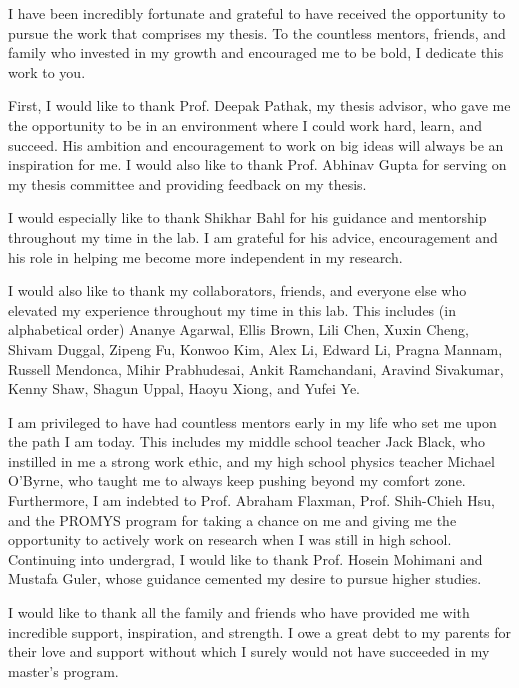 \documentclass[12pt]{cmuthesis}
\begin{document}
\begin{acknowledgments}
  I have been incredibly fortunate and grateful to have 
  received the opportunity to pursue the work that comprises
  my thesis. To the countless mentors, friends, and
  family who invested in my growth and encouraged me to be
  bold, I dedicate this work to you.

  First, I would like to thank Prof. Deepak Pathak, my 
  thesis  advisor, who gave me the opportunity to be 
  in an environment where I could work hard, learn, 
  and succeed. His ambition and encouragement to work
  on big ideas will always be an inspiration for me. 
  I would also like to thank Prof. Abhinav Gupta for
  serving on my thesis committee and providing feedback
  on my thesis.

  I would especially like to thank Shikhar Bahl for his
  guidance and mentorship throughout my time in the lab. 
  I am grateful for his advice, encouragement and his role
  in helping me become more independent in my research.

  I would also like to thank my collaborators, friends, 
  and everyone else who elevated my experience throughout
  my time in this lab. This includes (in alphabetical order)
  Ananye Agarwal, Ellis Brown, Lili Chen, Xuxin Cheng,
  Shivam Duggal, Zipeng Fu, Konwoo Kim, Alex Li, Edward Li, 
  Pragna Mannam, Russell Mendonca, Mihir Prabhudesai,
  Ankit Ramchandani, Aravind Sivakumar, Kenny Shaw, 
  Shagun Uppal, Haoyu Xiong, and Yufei Ye.

  I am privileged to have had countless mentors early in
  my life who set me upon the path I am today. This 
  includes my middle school teacher Jack Black, who 
  instilled in me a strong work ethic, and my high school 
  physics teacher Michael O'Byrne, who taught me to always
  keep pushing beyond my comfort zone. Furthermore, I 
  am indebted to Prof. Abraham Flaxman, Prof. Shih-Chieh
  Hsu, and the PROMYS program for taking a chance on me
  and giving me the opportunity to actively work on 
  research when I was still in high school. Continuing 
  into undergrad, I would like to thank Prof. Hosein 
  Mohimani and Mustafa Guler, whose guidance cemented my 
  desire to pursue higher studies.

  I would like to thank all the family and friends who 
  have provided me with incredible support, inspiration,
  and strength. I owe a great debt to my parents for their
  love and support without which I surely would not have
  succeeded in my master's program.
\end{acknowledgments}
\end{document}
